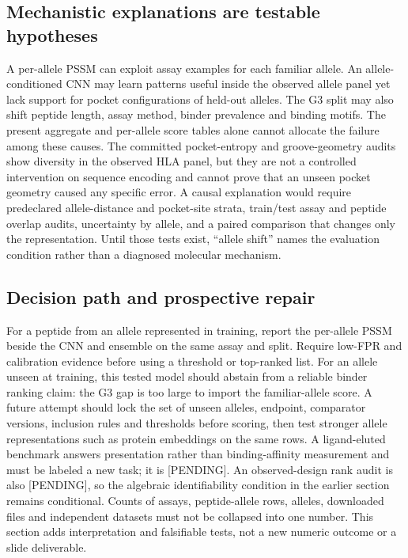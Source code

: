 \subsection{Mechanistic explanations are testable hypotheses}
A per-allele PSSM can exploit assay examples for each familiar allele. An allele-conditioned CNN may learn patterns useful inside the observed allele panel yet lack support for pocket configurations of held-out alleles. The G3 split may also shift peptide length, assay method, binder prevalence and binding motifs. The present aggregate and per-allele score tables alone cannot allocate the failure among these causes. The committed pocket-entropy and groove-geometry audits show diversity in the observed HLA panel, but they are not a controlled intervention on sequence encoding and cannot prove that an unseen pocket geometry caused any specific error. A causal explanation would require predeclared allele-distance and pocket-site strata, train/test assay and peptide overlap audits, uncertainty by allele, and a paired comparison that changes only the representation. Until those tests exist, ``allele shift'' names the evaluation condition rather than a diagnosed molecular mechanism.

\subsection{Decision path and prospective repair}
For a peptide from an allele represented in training, report the per-allele PSSM beside the CNN and ensemble on the same assay and split. Require low-FPR and calibration evidence before using a threshold or top-ranked list. For an allele unseen at training, this tested model should abstain from a reliable binder ranking claim: the G3 gap is too large to import the familiar-allele score. A future attempt should lock the set of unseen alleles, endpoint, comparator versions, inclusion rules and thresholds before scoring, then test stronger allele representations such as protein embeddings on the same rows. A ligand-eluted benchmark answers presentation rather than binding-affinity measurement and must be labeled a new task; it is [PENDING]. An observed-design rank audit is also [PENDING], so the algebraic identifiability condition in the earlier section remains conditional. Counts of assays, peptide-allele rows, alleles, downloaded files and independent datasets must not be collapsed into one number. This section adds interpretation and falsifiable tests, not a new numeric outcome or a slide deliverable.
